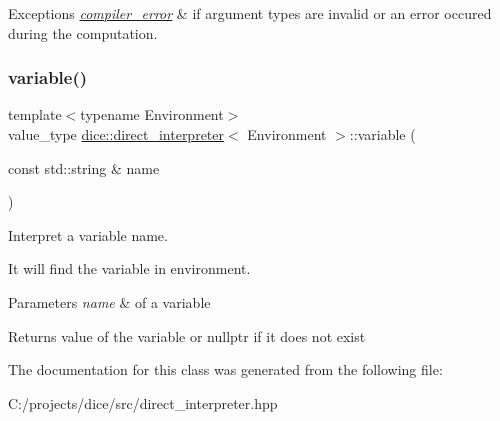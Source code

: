 \begin{DoxyExceptions}{Exceptions}
{\em \mbox{\hyperlink{classdice_1_1compiler__error}{compiler\+\_\+error}}} & if argument types are invalid or an error occured during the computation. \\
\hline
\end{DoxyExceptions}
\mbox{\label{classdice_1_1direct__interpreter_af43cc50aa076ba0d94513b7a91b83c1f}} 
\subsubsection{\texorpdfstring{variable()}{variable()}}
{\footnotesize\ttfamily template$<$typename Environment$>$ \\
value\+\_\+type \mbox{\hyperlink{classdice_1_1direct__interpreter}{dice\+::direct\+\_\+interpreter}}$<$ Environment $>$\+::variable (\begin{DoxyParamCaption}\item[{const std\+::string \&}]{name }\end{DoxyParamCaption})\hspace{0.3cm}{\ttfamily [inline]}}



Interpret a variable name. 

It will find the variable in environment.


\begin{DoxyParams}{Parameters}
{\em name} & of a variable\\
\hline
\end{DoxyParams}
\begin{DoxyReturn}{Returns}
value of the variable or nullptr if it does not exist 
\end{DoxyReturn}


The documentation for this class was generated from the following file\+:\begin{DoxyCompactItemize}
\item 
C\+:/projects/dice/src/direct\+\_\+interpreter.\+hpp\end{DoxyCompactItemize}
